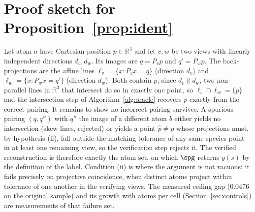 \section{Proof sketch for Proposition~\ref{prop:ident}}
\label{app:proof}
Let atom $a$ have Cartesian position $p \in \mathbb{R}^3$ and let $v, w$ be two views with linearly
independent directions $d_v, d_w$. Its images are $q = P_v p$ and $q' = P_w p$. The back-projections are
the affine lines $\ell_v = \{x : P_v x = q\}$ (direction $d_v$) and $\ell_w = \{x : P_w x = q'\}$
(direction $d_w$). Both contain $p$; since $d_v \not\parallel d_w$, two non-parallel lines in
$\mathbb{R}^3$ that intersect do so in exactly one point, so $\ell_v \cap \ell_w = \{p\}$ and the
intersection step of Algorithm~\ref{alg:oracle} recovers $p$ exactly from the correct pairing. It remains
to show no incorrect pairing survives. A spurious pairing $(q, q'')$ with $q''$ the image of a different
atom $b$ either yields no intersection (skew lines, rejected) or yields a point $\hat{p} \neq p$ whose
projections must, by hypothesis (ii), fall outside the matching tolerance of any same-species point in at
least one remaining view, so the verification step rejects it. The verified reconstruction is
therefore exactly the atom set, on which $\spg$ returns $y(s)$ by the definition of the label. Condition (ii) is where the argument is not vacuous: it fails precisely on projective coincidence, when
distinct atoms project within tolerance of one another in the verifying views. The measured ceiling gap
(0.0476 on the original sample) and its growth with atoms per cell (Section~\ref{sec:controls}) are
measurements of that failure set. 